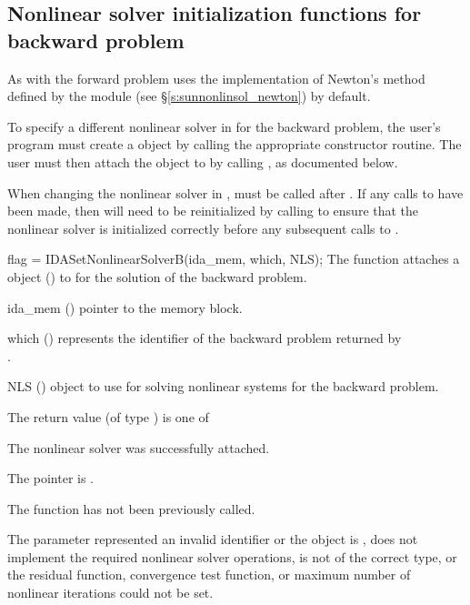 \subsection{Nonlinear solver initialization functions for backward problem}
\label{sss:nonlin_solv_init_b}

As with the forward problem {\idas} uses the {\sunnonlinsol} implementation of
Newton's method defined by the {\sunnonlinsolnewton} module (see
\S\ref{s:sunnonlinsol_newton}) by default.

To specify a different nonlinear solver in {\idas} for the backward problem, the
user's program must create a {\sunnonlinsol} object by calling the appropriate
constructor routine. The user must then attach the {\sunnonlinsol} object to
{\idas} by calling , as documented below.

When changing the nonlinear solver in {\idas}, 
must be called after . If any calls to  have been
made, then {\idas} will need to be reinitialized by calling 
to ensure that the nonlinear solver is initialized correctly before any
subsequent calls to .

{
  flag = IDASetNonlinearSolverB(ida\_mem, which, NLS);
}
{
  The function  attaches a {\sunnonlinsol}
  object () to {\idas} for the solution of the backward problem.
}
{
  \begin{args}
  \item[ida\_mem] ()
    pointer to the {\idas} memory block.
  \item[which] ()
    represents the identifier of the backward problem returned by \\ \noindent
    .
  \item[NLS] ()
    {\sunnonlinsol} object to use for solving nonlinear systems for the backward
    problem.
  \end{args}
}
{
  The return value  (of type ) is one of
  \begin{args}
  \item[\Id{IDA\_SUCCESS}]
    The nonlinear solver was successfully attached.
  \item[\Id{IDA\_MEM\_NULL}]
    The  pointer is .
  \item[\Id{IDALS\_NO\_ADJ}]
    The function  has not been previously called.
  \item[\Id{IDA\_ILL\_INPUT}]
    The parameter  represented an invalid identifier or the
    {\sunnonlinsol} object is , does not implement the required
    nonlinear solver operations, is not of the correct type, or the residual
    function, convergence test function, or maximum number of nonlinear
    iterations could not be set.
  \end{args}
}
{}



